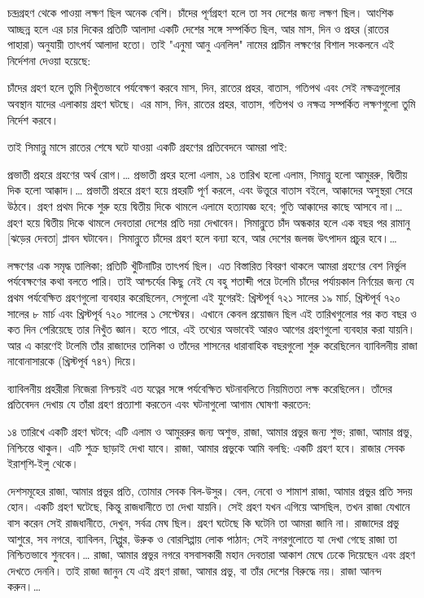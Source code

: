 চন্দ্রগ্রহণ থেকে পাওয়া লক্ষণ ছিল অনেক বেশি। চাঁদের পূর্ণগ্রহণ হলে তা সব দেশের জন্য লক্ষণ ছিল। আংশিক আচ্ছন্ন হলে এর চার দিকের প্রতিটি আলাদা একটি দেশের সঙ্গে সম্পর্কিত ছিল, আর মাস, দিন ও প্রহর (রাতের পাহারা) অনুযায়ী তাৎপর্য আলাদা হতো। তাই "এনুমা আনু এনলিল" নামের প্রাচীন লক্ষণের বিশাল সংকলনে এই নির্দেশনা দেওয়া হয়েছে:

চাঁদের গ্রহণ হলে তুমি নিখুঁতভাবে পর্যবেক্ষণ করবে মাস, দিন, রাতের প্রহর, বাতাস, গতিপথ এবং সেই নক্ষত্রগুলোর অবস্থান যাদের এলাকায় গ্রহণ ঘটছে। এর মাস, দিন, রাতের প্রহর, বাতাস, গতিপথ ও নক্ষত্র সম্পর্কিত লক্ষণগুলো তুমি নির্দেশ করবে।

তাই সিমান্নু মাসে রাতের শেষে ঘটে যাওয়া একটি গ্রহণের প্রতিবেদনে আমরা পাই:

প্রভাতী প্রহরে গ্রহণের অর্থ রোগ।… প্রভাতী প্রহর হলো এলাম, ১৪ তারিখ হলো এলাম, সিমান্নু হলো আমুররু, দ্বিতীয় দিক হলো আক্কাদ।… প্রভাতী প্রহরে গ্রহণ হয়ে প্রহরটি পূর্ণ করলে, এবং উত্তুরে বাতাস বইলে, আক্কাদের অসুস্থরা সেরে উঠবে। গ্রহণ প্রথম দিকে শুরু হয়ে দ্বিতীয় দিকে থামলে এলামে হত্যাযজ্ঞ হবে; গুতি আক্কাদের কাছে আসবে না।… গ্রহণ হয়ে দ্বিতীয় দিকে থামলে দেবতারা দেশের প্রতি দয়া দেখাবেন। সিমান্নুতে চাঁদ অন্ধকার হলে এক বছর পর রামানু [ঝড়ের দেবতা] প্লাবন ঘটাবেন। সিমান্নুতে চাঁদের গ্রহণ হলে বন্যা হবে, আর দেশের জলজ উৎপাদন প্রচুর হবে।…

লক্ষণের এক সমৃদ্ধ তালিকা; প্রতিটি খুঁটিনাটির তাৎপর্য ছিল। এত বিস্তারিত বিবরণ থাকলে আমরা গ্রহণের বেশ নির্ভুল পর্যবেক্ষণের কথা বলতে পারি। তাই আশ্চর্যের কিছু নেই যে বহু শতাব্দী পরে টলেমি চাঁদের পর্যায়কাল নির্ণয়ের জন্য যে প্রথম পর্যবেক্ষিত গ্রহণগুলো ব্যবহার করেছিলেন, সেগুলো এই যুগেরই: খ্রিস্টপূর্ব ৭২১ সালের ১৯ মার্চ, খ্রিস্টপূর্ব ৭২০ সালের ৮ মার্চ এবং খ্রিস্টপূর্ব ৭২০ সালের ১ সেপ্টেম্বর। এখানে কেবল প্রয়োজন ছিল এই তারিখগুলোর পর কত বছর ও কত দিন পেরিয়েছে তার নিখুঁত জ্ঞান। হতে পারে, এই তথ্যের অভাবেই আরও আগের গ্রহণগুলো ব্যবহার করা যায়নি। আর এ কারণেই টলেমি তাঁর রাজাদের তালিকা ও তাঁদের শাসনের ধারাবাহিক বছরগুলো শুরু করেছিলেন ব্যাবিলনীয় রাজা নাবোনাসারকে (খ্রিস্টপূর্ব ৭৪৭) দিয়ে।

ব্যাবিলনীয় প্রহরীরা নিজেরা নিশ্চয়ই এত যত্নের সঙ্গে পর্যবেক্ষিত ঘটনাবলিতে নিয়মিততা লক্ষ করেছিলেন। তাঁদের প্রতিবেদন দেখায় যে তাঁরা গ্রহণ প্রত্যাশা করতেন এবং ঘটনাগুলো আগাম ঘোষণা করতেন:

১৪ তারিখে একটি গ্রহণ ঘটবে; এটি এলাম ও আমুররুর জন্য অশুভ, রাজা, আমার প্রভুর জন্য শুভ; রাজা, আমার প্রভু, নিশ্চিন্তে থাকুন। এটি শুক্র ছাড়াই দেখা যাবে। রাজা, আমার প্রভুকে আমি বলছি: একটি গ্রহণ হবে। রাজার সেবক ইরাশ্‌শি-ইলু থেকে।

দেশসমূহের রাজা, আমার প্রভুর প্রতি, তোমার সেবক বিল-উসুর। বেল, নেবো ও শামাশ রাজা, আমার প্রভুর প্রতি সদয় হোন। একটি গ্রহণ ঘটেছে, কিন্তু রাজধানীতে তা দেখা যায়নি। সেই গ্রহণ যখন এগিয়ে আসছিল, তখন রাজা যেখানে বাস করেন সেই রাজধানীতে, দেখুন, সর্বত্র মেঘ ছিল। গ্রহণ ঘটেছে কি ঘটেনি তা আমরা জানি না। রাজাদের প্রভু আশুরে, সব নগরে, ব্যাবিলন, নিপ্পুর, উরুক ও বোরসিপ্পায় লোক পাঠান; সেই নগরগুলোতে যা দেখা গেছে রাজা তা নিশ্চিতভাবে শুনবেন।… রাজা, আমার প্রভুর নগরে বসবাসকারী মহান দেবতারা আকাশ মেঘে ঢেকে দিয়েছেন এবং গ্রহণ দেখতে দেননি। তাই রাজা জানুন যে এই গ্রহণ রাজা, আমার প্রভু, বা তাঁর দেশের বিরুদ্ধে নয়। রাজা আনন্দ করুন।…

